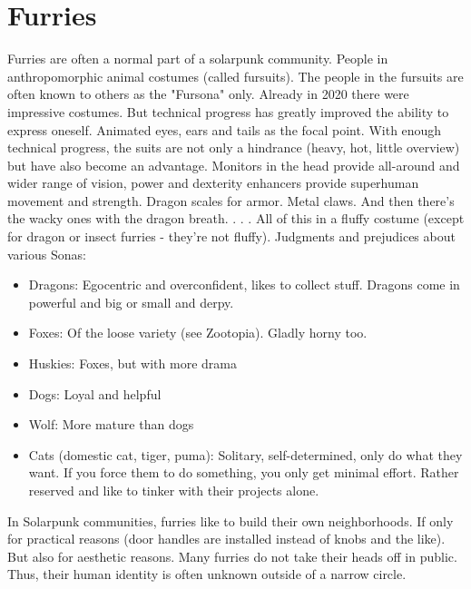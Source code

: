 \section{Furries}
Furries are often a normal part of a solarpunk community. People in anthropomorphic animal costumes (called fursuits). The people in the fursuits are often known to others as the "Fursona" only.
Already in 2020 there were impressive costumes. But technical progress has greatly improved the ability to express oneself. Animated eyes, ears and tails as the focal point.
With enough technical progress, the suits are not only a hindrance (heavy, hot, little overview) but have also become an advantage. Monitors in the head provide all-around and wider range of vision, power and dexterity enhancers provide superhuman movement and strength. Dragon scales for armor. Metal claws. And then there's the wacky ones with the dragon breath. . . .
All of this in a fluffy costume (except for dragon or insect furries - they're not fluffy).
Judgments and prejudices about various Sonas: 

\begin{itemize}
    \item Dragons: Egocentric and overconfident, likes to collect stuff. Dragons come in powerful and big or small and derpy.
    \item Foxes: Of the loose variety (see Zootopia). Gladly horny too.
    \item Huskies: Foxes, but with more drama
    \item Dogs: Loyal and helpful
    \item Wolf: More mature than dogs
    \item Cats (domestic cat, tiger, puma): Solitary, self-determined, only do what they want. If you force them to do something, you only get minimal effort. Rather reserved and like to tinker with their projects alone.
\end{itemize}

In Solarpunk communities, furries like to build their own neighborhoods. If only for practical reasons (door handles are installed instead of knobs and the like). But also for aesthetic reasons.
Many furries do not take their heads off in public. Thus, their human identity is often unknown outside of a narrow circle.
